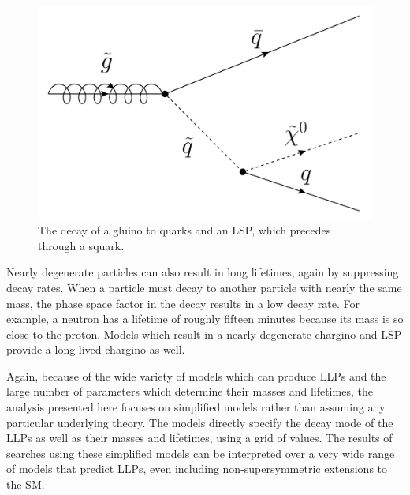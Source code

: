 \begin{figure}
\includegraphics[width=\fullfig]{figures/gluino_decay.png}
\caption{The decay of a gluino to quarks and an \acs*{LSP}, which precedes through a squark.}
\label{fig:gluino_decay}
\end{figure}

Nearly degenerate particles can also result in long lifetimes, again by suppressing decay rates.
When a particle must decay to another particle with nearly the same mass, the phase space factor in the decay results in a low decay rate.
For example, a neutron has a lifetime of roughly fifteen minutes because its mass is so close to the proton.
Models which result in a nearly degenerate chargino and \ac{LSP} provide a long-lived chargino as well.

Again, because of the wide variety of models which can produce \acp{LLP} and the large number of parameters which determine their masses and lifetimes, the analysis presented here focuses on simplified models rather than assuming any particular underlying theory.
The models directly specify the decay mode of the \acp{LLP} as well as their masses and lifetimes, using a grid of values.
The results of searches using these simplified models can be interpreted over a very wide range of models that predict \acp{LLP}, even including non-supersymmetric extensions to the \ac{SM}.
